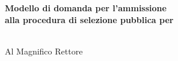 \begin{minipage}{.5\textwidth}
 \bf Modello di domanda per l'ammissione	\\[3pt]
 \bf alla  procedura di selezione pubblica per\\[3pt]
 \titleTextField{}\\[3pt]
\end{minipage}

\begin{flushright}
\begin{minipage}{.45\textwidth}
 \flushright Al Magnifico Rettore
 \flushright \titleTextField{}
\end{minipage}
\end{flushright}
